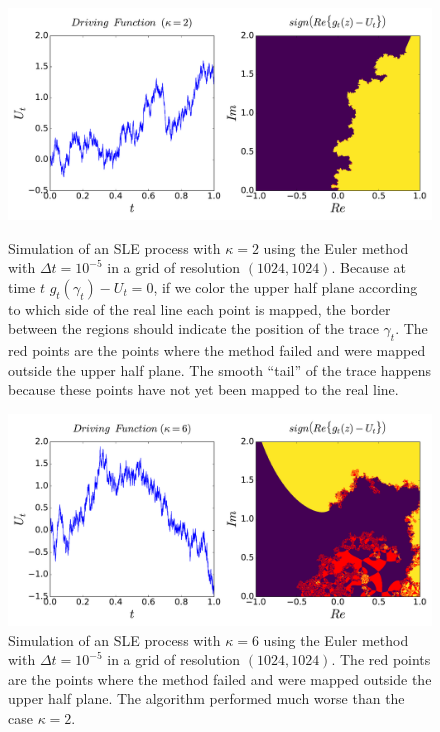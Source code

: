 \begin{figure}
\begin{center}
    \includegraphics[scale=0.45]{chapters/ch4-sle/figs/euler1}
\end{center}
\caption{Simulation of an SLE process with $\kappa=2$ using the Euler method
    with $\Delta t = 10^{-5}$ in a grid of resolution $(1024, 1024)$. Because
    at time $t$ $g_t(\gamma_t)-U_t=0$, if we color the upper half plane
    according to which side of the real line each point is mapped, the border
    between the regions should indicate the position of the trace $\gamma_t$.
    The red points are the points where the method failed and were mapped
    outside the upper half plane. The smooth ``tail'' of the trace happens
    because these points have not yet been mapped to the real line.}
\label{fig:euler1}
\begin{center}
    \includegraphics[scale=0.45]{chapters/ch4-sle/figs/euler2}
\end{center}
\caption{Simulation of an SLE process with $\kappa=6$ using the Euler method
    with $\Delta t = 10^{-5}$ in a grid of resolution $(1024, 1024)$. 
    The red points are the points where the method failed and were mapped
    outside the upper half plane. The algorithm performed much worse than
    the case $\kappa=2$.}
\label{fig:euler2}
\end{figure}


